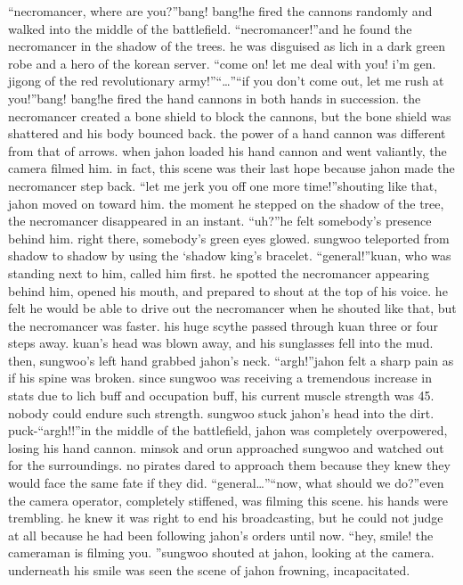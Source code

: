 “necromancer, where are you?”bang! bang!he fired the cannons randomly and walked into the middle of the battlefield.
“necromancer!”and he found the necromancer in the shadow of the trees.
 he was disguised as lich in a dark green robe and a hero of the korean server.
“come on! let me deal with you! i’m gen.
 jigong of the red revolutionary army!”“…”“if you don’t come out, let me rush at you!”bang! bang!he fired the hand cannons in both hands in succession.
 the necromancer created a bone shield to block the cannons, but the bone shield was shattered and his body bounced back.
the power of a hand cannon was different from that of arrows.
when jahon loaded his hand cannon and went valiantly, the camera filmed him.
in fact, this scene was their last hope because jahon made the necromancer step back.
“let me jerk you off one more time!”shouting like that, jahon moved on toward him.
 the moment he stepped on the shadow of the tree, the necromancer disappeared in an instant.
“uh?”he felt somebody’s presence behind him.
 right there, somebody’s green eyes glowed.
 sungwoo teleported from shadow to shadow by using the ‘shadow king’s bracelet.
“general!”kuan, who was standing next to him, called him first.
 he spotted the necromancer appearing behind him, opened his mouth, and prepared to shout at the top of his voice.
 he felt he would be able to drive out the necromancer when he shouted like that, but the necromancer was faster.
 his huge scythe passed through kuan three or four steps away.
kuan’s head was blown away, and his sunglasses fell into the mud.
 then, sungwoo’s left hand grabbed jahon’s neck.
“argh!”jahon felt a sharp pain as if his spine was broken.
 since sungwoo was receiving a tremendous increase in stats due to lich buff and occupation buff, his current muscle strength was 45.
 nobody could endure such strength.
sungwoo stuck jahon’s head into the dirt.
puck-“argh!!”in the middle of the battlefield, jahon was completely overpowered, losing his hand cannon.
minsok and orun approached sungwoo and watched out for the surroundings.
 no pirates dared to approach them because they knew they would face the same fate if they did.
“general…”“now, what should we do?”even the camera operator, completely stiffened, was filming this scene.
 his hands were trembling.
 he knew it was right to end his broadcasting, but he could not judge at all because he had been following jahon’s orders until now.
“hey, smile! the cameraman is filming you.
”sungwoo shouted at jahon, looking at the camera.
 underneath his smile was seen the scene of jahon frowning, incapacitated.
